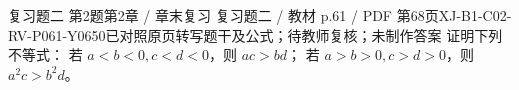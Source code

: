 \par\noindent\begin{minipage}{\linewidth}
\begin{bankitem}{复习题二 第2题}{第2章 / 章末复习 复习题二 / 教材 p.61 / PDF 第68页}{XJ-B1-C02-RV-P061-Y0650}{已对照原页转写题干及公式；待教师复核；未制作答案}
证明下列不等式：
若 $a<b<0,c<d<0$，则 $ac>bd$；
若 $a>b>0,c>d>0$，则 $a^2c>b^2d$。
\end{bankitem}
\end{minipage}\par\medskip
